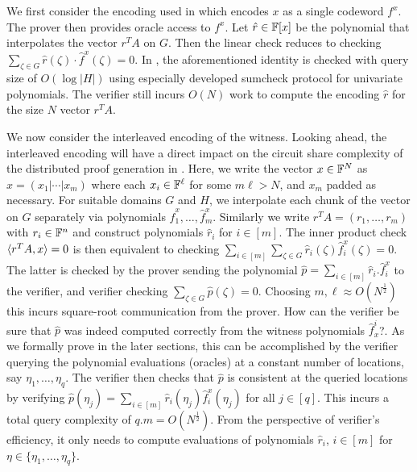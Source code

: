 	We first consider the encoding used in \cite{Aurora} which encodes $x$ as a single codeword $f^x$. The prover then provides oracle access to $f^x$. Let $\hat{r}\in\mathbb{F}[x]$ be the polynomial that interpolates the vector $r^TA$ on $G$. Then the linear check reduces to checking $\sum_{\zeta\in G}\hat{r}(\zeta) \cdot \hat{f}^x(\zeta) = 0$. In \cite{Aurora}, the aforementioned identity is checked with query size of $O(\log|H|)$ using especially developed	sumcheck protocol for univariate polynomials. The verifier still incurs $O(N)$ work to compute the encoding $\hat{r}$ for the size $N$ vector $r^TA$. 
	
	We now consider the interleaved encoding of the witness. Looking ahead, the interleaved encoding will have a direct impact on the circuit share complexity of the distributed proof generation in \name{}. Here, we write the vector $x\in \mathbb{F}^N$ as $x=(x_1|\cdots|x_m)$ where each $x_i\in \mathbb{F}^\ell$ for some $m\ell > N$, and $x_m$ padded as necessary. For suitable domains $G$ and $H$, we interpolate each chunk of the vector on $G$ 
	separately via polynomials $\hat{f}^x_1,\ldots,\hat{f}^x_m$. Similarly we write $r^TA=(r_1,\ldots,r_m)$ with $r_i\in \mathbb{F}^n$ and construct polynomials $\hat{r}_i$	for $i\in [m]$. The inner product check $\langle r^TA,x\rangle=0$ is then equivalent to checking $\sum_{i\in [m]}\sum_{\zeta\in G}\hat{r}_i(\zeta)\hat{f}^x_i(\zeta)=0$. The	latter is checked by the prover sending the polynomial $\hat{p}=\sum_{i\in
	[m]}\hat{r}_i.\hat{f}^x_i$ to the verifier, and verifier checking $\sum_{\zeta\in G}\hat{p}(\zeta)=0$. Choosing $m,\ell\approx O(N^\frac{1}{2})$ this incurs square-root communication from the prover. How can the verifier be sure that $\hat{p}$ was indeed computed correctly from the witness polynomials $\hat{f}^i_x$?. As we formally prove in the later sections, this can be accomplished by the verifier querying the polynomial evaluations (oracles) at a constant number of locations, say $\eta_1,\ldots,\eta_q$. The verifier then checks
	that $\hat{p}$ is consistent at the queried locations by verifying $\hat{p}(\eta_j)=\sum_{i\in [m]}\hat{r}_i(\eta_j)\hat{f}^x_i(\eta_j)$ for
	all $j\in [q]$. This incurs a total query complexity of $q.m=O(N^\frac{1}{2})$.	
	From the perspective of verifier's efficiency, it only needs to compute evaluations of polynomials $\hat{r}_i$, $i\in [m]$ for $\eta\in \{\eta_1,\ldots,\eta_q\}$. %


